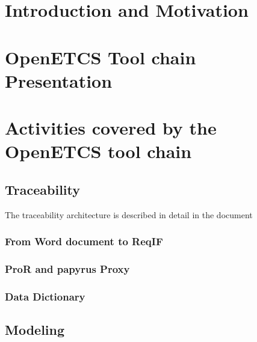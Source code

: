 \documentclass{template/openetcs_report}
\begin{document}
\printglossary
\mainmatter
\chapter{Introduction and Motivation}



\chapter{OpenETCS Tool chain Presentation}
\label{chap:toolchaindef}




\chapter{Activities covered by the OpenETCS tool chain}
\label{chap:reqhandling}

  \section{Traceability}
The traceability architecture is described in detail in the document \cite{O7_trace}
    \subsection{From Word document to ReqIF}
    \subsection{ProR and papyrus Proxy}
    \subsection{Data Dictionary}

  \section{Modeling}
\label{sec:model}
\end{document}
